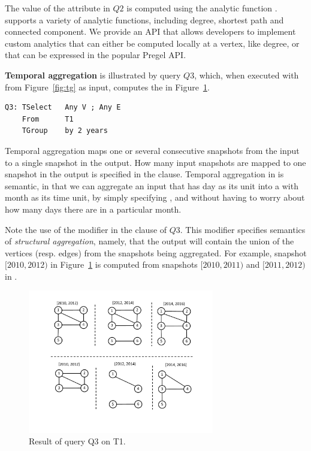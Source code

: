 The value of the attribute  in $Q2$ is computed using the
analytic function .  \ql supports a variety of
analytic functions, including degree, shortest path and connected
component.  We provide an API that allows developers to implement
custom analytics that can either be computed locally at a vertex, like
degree, or that can be expressed in the popular Pregel
API. 

{\bf Temporal aggregation} is illustrated by query $Q3$, which, when
executed with  from Figure~\ref{fig:tg} as input, computes
the \tg in Figure~\ref{fig:q3}.

\begin{verbatim}
Q3: TSelect   Any V ; Any E 
    From      T1
    TGroup    by 2 years
\end{verbatim}

Temporal aggregation maps one or several consecutive snapshots from
the input to a single snapshot in the output.  How many input
snapshots are mapped to one snapshot in the output is specified in the
 clause.  Temporal aggregation in \ql is semantic, in
that we can aggregate an input \tg that has day as its unit into a \tg
with month as its time unit, by simply specifying , and without having to worry about how many days there are in
a particular month.

Note the use of the modifier  in the  clause
of $Q3$.  This modifier specifies semantics of {\em structural
  aggregation}, namely, that the output will contain the union of the
vertices (resp. edges) from the snapshots being aggregated.  For
example, snapshot $[2010, 2012)$ in Figure~\ref{fig:q3} is computed
  from snapshots $[2010, 2011)$ and $[2011, 2012)$ in .

\begin{figure}
\includegraphics[width=3.2in]{figs/TGroupAny.pdf}
\caption{Result of query Q3 on T1.}
\label{fig:q3}
\end{figure}


